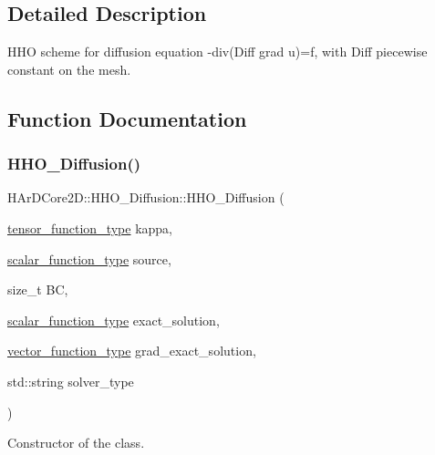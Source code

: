 \subsection{Detailed Description}
H\+HO scheme for diffusion equation -\/div(Diff grad u)=f, with Diff piecewise constant on the mesh. 



\subsection{Function Documentation}
\mbox{\label{group__HHO__Diffusion_ga32ee13003e4eda510daa25737fa60e47}} 
\subsubsection{\texorpdfstring{H\+H\+O\+\_\+\+Diffusion()}{HHO\_Diffusion()}}
{\footnotesize\ttfamily H\+Ar\+D\+Core2\+D\+::\+H\+H\+O\+\_\+\+Diffusion\+::\+H\+H\+O\+\_\+\+Diffusion (\begin{DoxyParamCaption}\item[{\hyperlink{classHArDCore2D_1_1HHO__Diffusion_af2d9bd4031a898a3619812343aa5c2c9}{tensor\+\_\+function\+\_\+type}}]{kappa,  }\item[{\hyperlink{classHArDCore2D_1_1HHO__Diffusion_abe94c05310207687b5f3a4af2ea1c97b}{scalar\+\_\+function\+\_\+type}}]{source,  }\item[{size\+\_\+t}]{BC,  }\item[{\hyperlink{classHArDCore2D_1_1HHO__Diffusion_abe94c05310207687b5f3a4af2ea1c97b}{scalar\+\_\+function\+\_\+type}}]{exact\+\_\+solution,  }\item[{\hyperlink{classHArDCore2D_1_1HHO__Diffusion_adad1657301e86deba6abcb5e7e6048e4}{vector\+\_\+function\+\_\+type}}]{grad\+\_\+exact\+\_\+solution,  }\item[{std\+::string}]{solver\+\_\+type }\end{DoxyParamCaption})}



Constructor of the class. 


